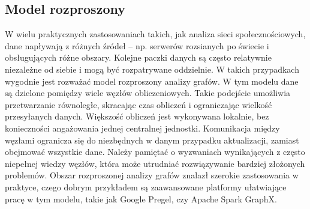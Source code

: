    \subsection{Model rozproszony}
        W wielu praktycznych zastosowaniach takich, jak analiza sieci społecznościowych, dane napływają z różnych źródeł -- np. serwerów rozsianych po świecie i obsługujących różne obszary. Kolejne paczki danych są często relatywnie niezależne od siebie i mogą być rozpatrywane oddzielnie. W takich przypadkach wygodnie jest rozważać model rozproszony analizy grafów. W tym modelu dane są dzielone pomiędzy wiele węzłów obliczeniowych. Takie podejście umożliwia przetwarzanie równoległe, skracając czas obliczeń i ograniczając wielkość przesyłanych danych. Większość obliczeń jest wykonywana lokalnie, bez konieczności angażowania jednej centralnej jednostki. Komunikacja między węzłami ogranicza się do niezbędnych w danym przypadku aktualizacji, zamiast obejmować wszystkie dane. Należy pamiętać o wyzwaniach wynikających z często niepełnej wiedzy węzłów, która może utrudniać rozwiązywanie bardziej złożonych problemów. Obszar rozproszonej analizy grafów znalazł szerokie zastosowania w praktyce, czego dobrym przykładem są zaawansowane platformy ułatwiające pracę w tym modelu, takie jak Google Pregel\cite{Malewicz_Austern_Bik_Dehnert_Horn_Leiser_Czajkowski_2010}, czy Apache Spark GraphX\cite{Xin_Gonzalez_Franklin_Stoica_2013}. 